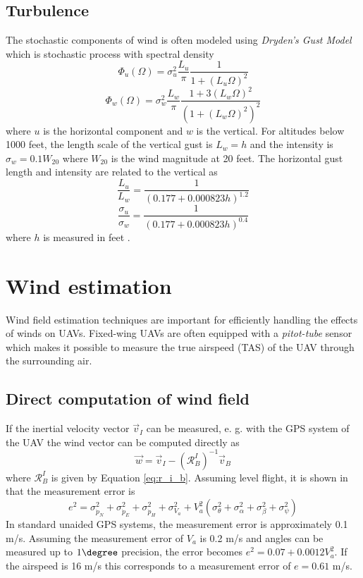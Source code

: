 \subsection{Turbulence}
The stochastic components of wind is often modeled using \textit{Dryden's Gust Model} which is stochastic process with spectral density 
\begin{equation}
    \Phi_u(\Omega)=\sigma_u^2\frac{L_u}{\pi}\frac{1}{1+(L_u\Omega)^2}
\end{equation}
\begin{equation}
    \Phi_w(\Omega)=\sigma_w^2\frac{L_w}{\pi}\frac{1 + 3(L_w\Omega)^2}{(1+(L_w\Omega)^2)^2}
\end{equation}
where $u$ is the horizontal component and $w$ is the vertical. For altitudes below 1000 feet, the length scale of the vertical gust is 
$L_w=h$ and the intensity is $\sigma_w=0.1W_{20}$ where $W_{20}$ is the wind magnitude at 20 feet. The horizontal gust length and intensity are related to the vertical as 
\begin{equation}
    \frac{L_u}{L_w}=\frac{1}{(0.177 + 0.000823h)^{1.2}}
\end{equation}
\begin{equation}
    \frac{\sigma_u}{\sigma_w}=\frac{1}{(0.177 + 0.000823h)^{0.4}}
\end{equation}
where $h$ is measured in feet \cite{wind_direct_computation}.

\section{Wind estimation}
Wind field estimation techniques are important for efficiently handling the effects of winds on UAVs. 
Fixed-wing UAVs are often equipped with a \textit{pitot-tube} sensor which makes it possible to measure the 
true airspeed (TAS) of the UAV through the surrounding air.
\subsection{Direct computation of wind field}
If the inertial velocity vector $\vec{v}_I$ can be measured, e. g. with the GPS system of the UAV the wind vector can be 
computed directly as 
\begin{equation}
    \vec{w} = \vec{v}_I - (\mathcal{R}^I_B)^{-1}\vec{v}_B
\end{equation}
where $\mathcal{R}^I_B$ is given by Equation \eqref{eq:r_i_b}. Assuming level flight, it is shown in \cite{wind_direct_computation} that 
the measurement error is
\begin{equation}
    e^2=\sigma_{\dot{p}_N}^2+\sigma_{\dot{p}_E}^2+\sigma_{\dot{p}_H}^2+\sigma_{V_a}^2 + V_a^2(\sigma_{\theta}^2+\sigma_{\alpha}^2+\sigma_{\beta}^2+\sigma_{\psi}^2)
\end{equation}
In standard unaided GPS systems, the measurement error is approximately 0.1 m/s. Assuming the measurement error of $V_a$ is 0.2 m/s and angles 
can be measured up to $1\degree$ precision, the error becomes $e^2=0.07+0.0012V_a^2$. If the airspeed is 16 m/s this corresponds to a measurement error of 
$e=0.61$ m/s.
